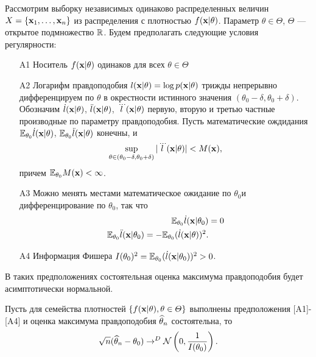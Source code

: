 Рассмотрим выборку независимых одинаково распределенных величин $X = \{\mathbf{x}_1, \ldots, \mathbf{x}_{n} \}$ из распределения с плотностью $f(\mathbf{x} | \theta)$. 
Параметр $\theta \in \Theta$, $\Theta$ --- открытое подмножество $\mathbb{R}$.
Будем предполагать следующие условия регулярности:
\begin{itemize}
	\item[A1] Носитель $f(\mathbf{x} | \theta)$ одинаков для всех $\theta \in \Theta$
	\item[A2] Логарифм правдоподобия $l(\mathbf{x} | \theta) = \log p(\mathbf{x} | \theta)$ трижды непрерывно дифференцируем по $\theta$ в окрестности истинного значения $(\theta_0 - \delta, \theta_0 + \delta)$. Обозначим $\dot{l}(\mathbf{x} | \theta)$,
	$\ddot{l}(\mathbf{x} | \theta)$, $\dddot{l}(\mathbf{x} | \theta)$ первую, вторую и третью частные производные по параметру правдоподобия. Пусть математические ождидания $\mathbb{E}_{\theta_0} \dot{l}(\mathbf{x} | \theta)$, 
	$\mathbb{E}_{\theta_0} \ddot{l}(\mathbf{x} | \theta)$ конечны, и
	\[
	\sup_{\theta \in (\theta_0 - \delta, \theta_0 + \delta)} |\dddot{l}(\mathbf{x} | \theta)| < M(\mathbf{x}),
	\]
	причем $\mathbb{E}_{\theta_0} M(\mathbf{x}) < \infty$.
	\item[A3] Можно менять местами математическое ожидание по $\theta_0$и дифференцирование по $\theta_0$, так что
	\begin{align*}
	\mathbb{E}_{\theta_0} \dot{l}(\mathbf{x} | \theta_0) &= 0 \\
	\mathbb{E}_{\theta_0} \ddot{l}(\mathbf{x} | \theta_0) = - \mathbb{E}_{\theta_0} (\dot{l}(\mathbf{x} | \theta))^2.
	\end{align*}
	\item[A4] Информация Фишера $I(\theta_0)^2 = \mathbb{E}_{\theta_0} (\dot{l}(\mathbf{x} | \theta_0))^2 > 0$.
\end{itemize}

В таких предположениях состоятельная оценка максимума правдоподобия
будет асимптотически нормальной.

\begin{Theorem}
Пусть для семейства плотностей $\{f(\mathbf{x}|\theta), \theta \in \varTheta\}$ выполнены предположения [A1]-[A4] и оценка максимума правдоподобия $\widehat{\theta}_{n}$ состоятельна, то
\[
\sqrt{n} (\widehat{\theta}_{n} - \theta_0) \rightarrow^D \mathcal{N} \left(0, \frac{1}{I(\theta_0)}\right).
\]
\end{Theorem}

